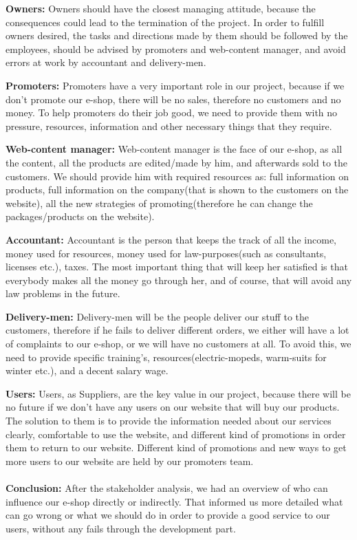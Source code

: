 \documentclass[12p]{article}
\begin{document}
\textbf{Owners:}
Owners should have the closest managing attitude, because the consequences could lead to the termination of the project. In order to fulfill owners desired, the tasks and directions made by them should be followed by the employees, should be advised by promoters and web-content manager, and avoid errors at work by accountant and delivery-men.

\textbf{Promoters:}
Promoters have a very important role in our project, because if we don't promote our e-shop, there will be no sales, therefore no customers and no money. To help promoters do their job good, we need to provide them with no pressure, resources, information and other necessary things that they require.

\textbf{Web-content manager:}
Web-content manager is the face of our e-shop, as all the content, all the products are edited/made by him, and afterwards sold to the customers. We should provide him with required resources as: full information on products, full information on the company(that is shown to the customers on the website), all the new strategies of promoting(therefore he can change the packages/products on the website).

\textbf{Accountant:}
Accountant is the person that keeps the track of all the income, money used for resources, money used for law-purposes(such as consultants, licenses etc.), taxes. The most important thing that will keep her satisfied is that everybody makes all the money go through her, and of course, that will avoid any law problems in the future.

\textbf{Delivery-men:}
Delivery-men will be the people deliver our stuff to the customers, therefore if he fails to deliver different orders, we either will have a lot of complaints to our e-shop, or we will have no customers at all. To avoid this, we need to provide specific training's, resources(electric-mopeds, warm-suits for winter etc.), and a decent salary wage.

\textbf{Users:}
Users, as Suppliers, are the key value in our project, because there will be no future if we don't have any users on our website that will buy our products. The solution to them is to provide the information needed about our services clearly, comfortable to use the website, and different kind of promotions in order them to return to our website. Different kind of promotions and new ways to get more users to our website are held by our promoters team.
\\
\\
\textbf{Conclusion:}
After the stakeholder analysis, we had an overview of who can influence our e-shop directly or indirectly. That informed us more detailed what can go wrong or what we should do in order to provide a good service to our users, without any fails through the development part.
\end{document}
